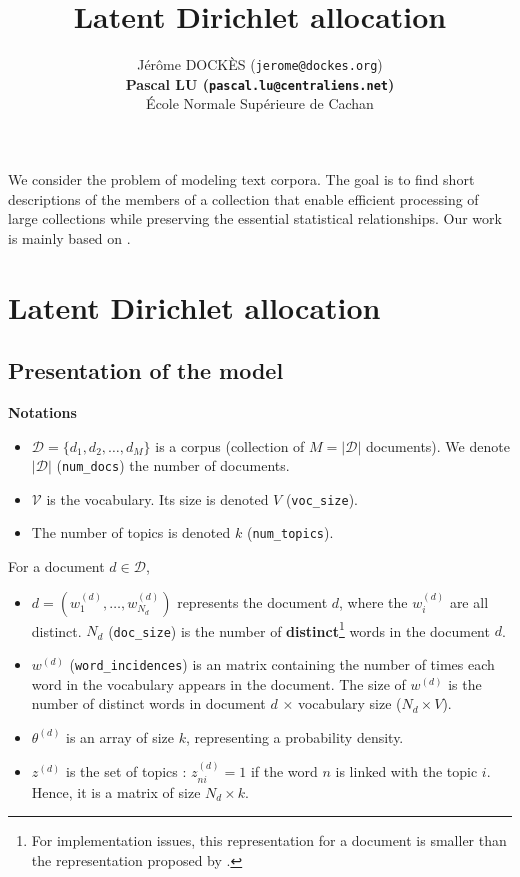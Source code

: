\documentclass{article}
\title{Latent Dirichlet allocation}
\author{
J\'er\^ome DOCK\`ES (\texttt{jerome@dockes.org}) \\
\textbf{Pascal LU (\texttt{pascal.lu@centraliens.net})} \\
\'Ecole Normale Sup\'erieure de Cachan \\
}
\begin{document}
\maketitle

We consider the problem of modeling text corpora. The goal is to find short descriptions of the members of a collection that enable efficient processing of large collections while preserving the essential statistical relationships. Our work is mainly based on \cite{BNJ03}.

\section{Latent Dirichlet allocation}
\subsection{Presentation of the model}

\textbf{Notations}
\begin{itemize}
\setlength\itemsep{-0.2em}
  \item $\mathcal{D} = \{d_{1},d_{2}, \ldots, d_{M}\}$ is a corpus (collection of $M=|\mathcal{D}|$ documents). We denote $|\mathcal{D}|$ (\verb"num_docs") the number of documents.
  \item $\mathcal{V}$ is the vocabulary. Its size is denoted $V$ (\verb"voc_size").
  \item The number of topics is denoted $k$ (\verb"num_topics").
\end{itemize}

For a document $d \in \mathcal{D}$,
\begin{itemize}  
\setlength\itemsep{-0.2em}
  \item $d = (w_1^{(d)}, \ldots, w_{N_d}^{(d)})$ represents the document $d$, where the $w_i^{(d)}$ are all distinct. $N_d$ (\verb"doc_size") is the number of \textbf{distinct}\footnote{For implementation issues, this representation for a document is smaller than the representation proposed by \cite{BNJ03}.} words in the document $d$.
  \item $w^{(d)}$ (\verb"word_incidences") is an matrix containing the number of times each word in the vocabulary appears in the document. The size of $w^{(d)}$ is the number of distinct words in document $d$ $\times$ vocabulary size ($N_d \times V$).
 \item $\theta^{(d)}$ is an array of size $k$, representing a probability density.
 \item $z^{(d)}$ is the set of topics : $z_{ni}^{(d)} =  1$ if the word $n$ is linked with the topic $i$. Hence, it is a matrix of size $N_d \times k$.
\end{itemize}
\end{document}
